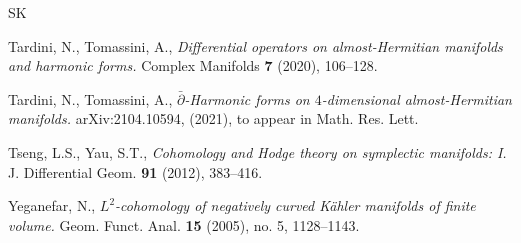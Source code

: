 \documentclass[12pt, twoside]{article}
\theoremstyle{definition}
\numberwithin{equation}{section}
\def\pa{\partial}
\begin{document}
\begin{thebibliography}{SK}
		
		Tardini, N.,  Tomassini, A.,
		\textit{Differential operators on almost-Hermitian manifolds and harmonic forms.}	
		Complex Manifolds \textbf{7} (2020), 106--128.
		
		Tardini, N., Tomassini, A.,
		\textit{$\bar{\pa}$-Harmonic forms on $4$-dimensional almost-Hermitian manifolds.}
		arXiv:2104.10594, (2021), to appear in Math. Res. Lett.
		
		Tseng, L.S.,  Yau, S.T., 
		\textit{Cohomology and Hodge theory on symplectic manifolds: I.}
		J. Differential Geom. \textbf{91} (2012), 383--416.
		
		Yeganefar, N.,
		\textit{ $L^{2}$-cohomology of negatively curved K\"{a}hler manifolds of finite volume.}
		Geom. Funct. Anal. \textbf{15} (2005), no. 5, 1128--1143. 
		
		
	\end{thebibliography}
\end{document}
